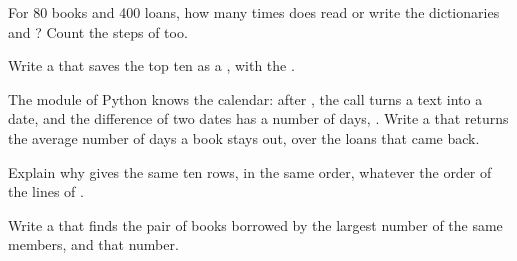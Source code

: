 \begin{exercise}[$\star\star$]\label{exo:g8:project-data-explorer:8}
For 80 books and 400 loans, how many times does  read
or write the dictionaries  and ? Count the steps of
 too.
\end{exercise}

\begin{exercise}[$\star\star$]\label{exo:g8:project-data-explorer:9}
Write a   that saves the top ten as a
, with the  .
\end{exercise}

\begin{exercise}[$\star\star\star$]\label{exo:g8:project-data-explorer:10}
The module  of Python knows the calendar: after
, the call
 turns a text into a date, and the
difference of two dates has a number of days, . Write a 
 that returns the average number of days a book
stays out, over the loans that came back.
\end{exercise}

\begin{exercise}[$\star\star\star$]\label{exo:g8:project-data-explorer:11}
Explain why  gives the same ten rows, in the same order,
whatever the order of the lines of .
\end{exercise}

\begin{exercise}[$\star\star\star$]\label{exo:g8:project-data-explorer:12}
Write a   that finds the pair of books
borrowed by the largest number of the same members, and that number.
\end{exercise}
